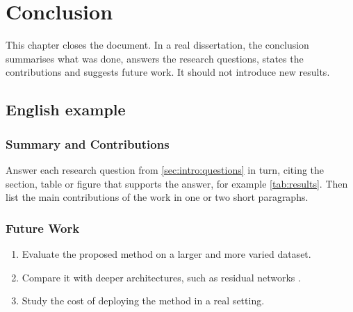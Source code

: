 \chapter{Conclusion}
\label{chap:conclusion}

This chapter closes the document. In a real dissertation, the conclusion
summarises what was done, answers the research questions, states the
contributions and suggests future work. It should not introduce new results.

\section{English example}
\label{sec:conclusion:en}

\subsection{Summary and Contributions}
\label{sec:conclusion:summary}

Answer each research question from \cref{sec:intro:questions} in turn, citing
the section, table or figure that supports the answer, for example
\cref{tab:results}. Then list the main contributions of the work in one or
two short paragraphs.

\subsection{Future Work}
\label{sec:conclusion:future}

\begin{enumerate}
  \item Evaluate the proposed method on a larger and more varied dataset.
  \item Compare it with deeper architectures, such as residual networks
        \cite{He2016}.
  \item Study the cost of deploying the method in a real setting.
\end{enumerate}

